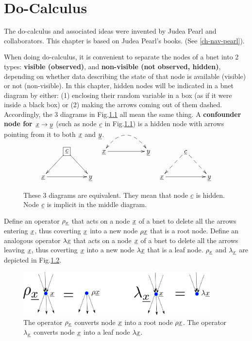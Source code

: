 \chapter{Do-Calculus}\label{chap-do-calc}


The do-calculus and associated ideas were
invented by
Judea Pearl and collaborators.
This chapter is 
based on Judea Pearl's
books. (See \ref{ch-nav-pearl}).


When
doing
do-calculus,
it is 
convenient
to separate
the nodes
of a bnet
into
2  types:
{\bf visible (observed)},
and {\bf non-visible (not observed,
hidden)},
depending
on
whether data
describing
the
state 
of that
node
is available 
(visible) or not (non-visible).
In this chapter, hidden nodes will 
be indicated 
in a bnet
diagram by
either: (1)
enclosing
their random variable
in a box (as
if it were inside a black box) or
(2) making
the arrows
coming
out of them
dashed.
Accordingly, 
the 
3 diagrams 
in
Fig.\ref{fig-hidden-dashes}
all mean the same thing.
A {\bf confounder node
for ${\underline{x}}\rightarrow {\underline{y}}$}
(such as node
${\underline{c}}$
in Fig.\ref{fig-hidden-dashes})
is a hidden node 
with arrows
pointing
from it to
both
${\underline{x}}$ and ${\underline{y}}$.



\begin{figure}[h!]
$$\xymatrix{
&*+[F]{\rvc}\ar[dl]\ar[dr]
\\
\rvx\ar[rr]&&\rvy
}
\;\;\;
\xymatrix{
\rvx\ar@{-->}@{<-->}@/^2pc/[rr]
\ar[rr]&&\rvy
}
\;\;\;
\xymatrix{
&\rvc\ar@{-->}[dl]\ar@{-->}[dr]
\\
\rvx\ar[rr]&&\rvy
}$$
\caption{
These 3 diagrams
are equivalent.
They
mean that node ${\underline{c}}$
is hidden.
Node ${\underline{c}}$
is implicit
in the
middle diagram.}
\label{fig-hidden-dashes}
\end{figure}



Define
an
operator
$\rho_{\underline{x}}$
that acts on
a node
${\underline{x}}$
of a bnet
to
delete
all
the 
arrows
entering
${\underline{x}}$,
thus
coverting
${\underline{x}}$
into
a new
node $\rho {\underline{x}}$
that
is a root node.
Define 
an analogous 
operator
$\lambda{\underline{x}}$
that acts on
a node
${\underline{x}}$
of a bnet
to
delete
all
the 
arrows
leaving
${\underline{x}}$,
thus
coverting
${\underline{x}}$
into
a new
node $\lambda {\underline{x}}$
that
is a leaf node.
$\rho_{\underline{x}}$
and
$\lambda_{\underline{x}}$
are
depicted
in Fig.\ref{fig-do-rho-lam}.



\begin{figure}[h!]
\centering
\includegraphics[width=4in]
{do/do-rho-lam.png}
\caption{
The operator $\rho_{\underline{x}}$
converts node ${\underline{x}}$
into a root node $\rho {\underline{x}}$.
The operator $\lambda_{\underline{x}}$
converts node ${\underline{x}}$
into a leaf node $\lambda{\underline{x}}$.
} 
\label{fig-do-rho-lam}
\end{figure}


